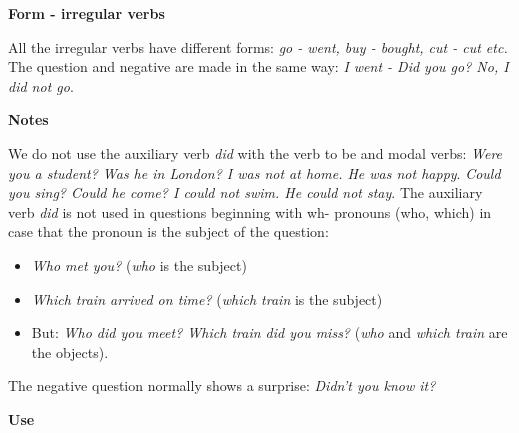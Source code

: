 \textbf{Form - irregular verbs}

All the irregular verbs have different forms: \textit{go - went, buy - bought, cut - cut etc.}
The question and negative are made in the same way: \textit{I went - Did you go? No, I did not go}.

\textbf{Notes}

We do not use the auxiliary verb \textit{did} with the verb to be and modal verbs: \textit{Were you a student? Was he in London? I was not at home. He was not happy}. \textit{Could you sing? Could he come? I could not swim. He could not stay}. The auxiliary verb \textit{did} is not used in questions beginning with wh- pronouns (who, which) in case that the pronoun is the subject of the question:

\begin{itemize}
\item \textit{Who met you?} (\textit{who} is the subject)
\item \textit{Which train arrived on time?} (\textit{which train} is the subject)
\item But: \textit{Who did you meet? Which train did you miss?} (\textit{who} and \textit{which train} are the objects).
\end{itemize}

The negative question normally shows a surprise: \textit{Didn't you know it?}

\textbf{Use}

